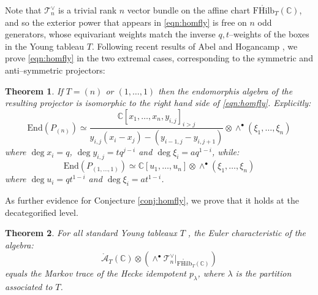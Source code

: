 \documentclass[12pt]{amsart}
\numberwithin{equation}{section}
\newtheorem{theorem}{Theorem}[section]
\theoremstyle{definition}
\theoremstyle{remark}
\newtheorem{remark}[theorem]{Remark}
\newcommand{\CC}{\mathbb{C}}
\newcommand{\CA}{\mathcal{A}}
\newcommand{\CT}{\mathcal{T}}
\renewcommand{\1}{\mathbf{1}}
\newcommand{\End}{\mathrm{End}}
\newcommand{\FH}{\mathrm{FHilb}}
\newcommand{\oFH}{\mathring{\FH}}
\newcommand{\oCA}{\mathring{\CA}}
\begin{document}
Note that $\CT_n^{\vee}$ is a trivial rank $n$ vector bundle on the affine chart $\oFH_T(\CC)$, and so the exterior power that appears in \eqref{eqn:homfly} is free on $n$ odd generators, whose equivariant weights match the inverse $q,t$--weights of the boxes in the Young tableau $T$. Following recent results of Abel and Hogancamp \cite{AbHog,Hog}, we prove \eqref{eqn:homfly} in the two extremal cases, corresponding to the symmetric and anti--symmetric projectors:
 
\begin{theorem}
\label{thm:symm antisymm}
If $T=(n)$ or $(1,\ldots,1)$ then the endomorphis algebra
of the resulting projector is isomorphic to the right hand side of \eqref{eqn:homfly}. Explicitly:
\begin{equation}
\label{eqn:antisym}
\End(P_{(n)})\simeq  \frac {\CC[x_1,\ldots,x_n, y_{i,j}]_{i>j}}{y_{i,j}(x_i-x_j) - (y_{i-1,j} - y_{i,j+1})} \otimes \wedge^{\bullet}(\xi_1,\ldots,\xi_n)
\end{equation}
where $\deg x_i = q$, $\deg y_{i,j} = t q^{j-i}$ and $\deg \xi_i = a q^{1-i}$, while:
\begin{equation}
\label{eqn:sym}
\End(P_{(1,...,1)})\simeq \CC[u_1,\ldots,u_n]\otimes \wedge^{\bullet}(\xi_1,\ldots,\xi_n)
\end{equation}
where $\deg u_i = q t^{1-i}$ and $\deg \xi_i =a t^{1-i}$.  
\end{theorem}


As further evidence for Conjecture \ref{conj:homfly}, we prove that it holds at the decategorified level.

\begin{theorem}
\label{thm:hecke projector}
For all standard Young tableaux $T$ , the Euler characteristic of the algebra:
$$
\oCA_T(\CC) \otimes \left( \wedge^{\bullet}\CT_n^{\vee}|_{\oFH_T(\CC)} \right)
$$
equals the Markov trace of the Hecke idempotent $p_{\lambda}$, where \(\lambda\) is the partition associated to \(T\). %
\end{theorem}
\end{document}
